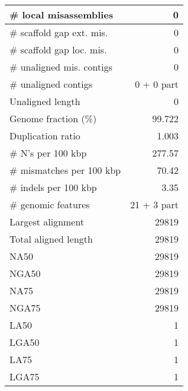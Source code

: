 \documentclass[12pt,a4paper]{article}
\begin{document}
\begin{table}[ht]
\begin{center}
\begin{tabular}{|l*{1}{|r}|}
\# local misassemblies & 0 \\ \hline
\# scaffold gap ext. mis. & 0 \\ \hline
\# scaffold gap loc. mis. & 0 \\ \hline
\# unaligned mis. contigs & 0 \\ \hline
\# unaligned contigs & 0 + 0 part \\ \hline
Unaligned length & 0 \\ \hline
Genome fraction (\%) & 99.722 \\ \hline
Duplication ratio & 1.003 \\ \hline
\# N's per 100 kbp & 277.57 \\ \hline
\# mismatches per 100 kbp & 70.42 \\ \hline
\# indels per 100 kbp & 3.35 \\ \hline
\# genomic features & 21 + 3 part \\ \hline
Largest alignment & 29819 \\ \hline
Total aligned length & 29819 \\ \hline
NA50 & 29819 \\ \hline
NGA50 & 29819 \\ \hline
NA75 & 29819 \\ \hline
NGA75 & 29819 \\ \hline
LA50 & 1 \\ \hline
LGA50 & 1 \\ \hline
LA75 & 1 \\ \hline
LGA75 & 1 \\ \hline
\end{tabular}
\end{center}
\end{table}
\end{document}

